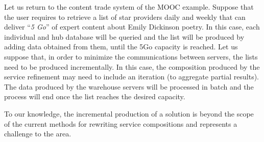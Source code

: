 \color{red}
\begin{example}\label{Ex:rew2}
Let us return to the content  trade system of the MOOC example.
 Suppose that the user requires to retrieve a list of star providers  daily and weekly that can deliver ``\textit{5 Go}'' of expert content about Emily Dickinson poetry.
In this case, each individual and hub database will be queried and the list will be produced by adding data obtained from them, until the 5Go  capacity is reached.
Let us suppose that, in order to minimize the  communications between servers, the lists need to be produced incrementally.
In this case, the composition produced by the service refinement may need to include an iteration (to aggregate partial results). 
The data produced by the warehouse servers will be processed in batch and the process will end once the list reaches the desired capacity.

To our knowledge, the incremental production of a solution is beyond  the scope of the current methods for rewriting service compositions and represents a challenge to the area.
~\hfill\openbox
\end{example}

\color{black}

 
   
 
